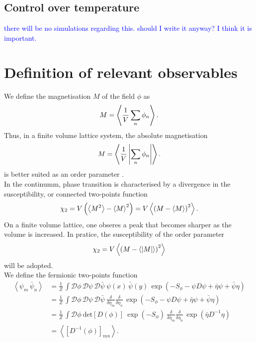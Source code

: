 \subsection{Control over temperature}
\textcolor{blue}{there will be no simulations regarding this. should I write it anyway? I think it is important.}

\section{Definition of relevant observables}
\label{sec:observables}
We define the magnetisation $M$ of the field $\phi$ as
\begin{equation*}
    M = \left\langle \frac{1}{V}\sum_n \phi_n \right\rangle.
\end{equation*}
Thus, in a finite volume lattice system, the absolute magnetisation
\begin{equation*}
    M = \left\langle \frac{1}{V}\left|\sum_n \phi_n\right| \right\rangle.
\end{equation*}
is better suited as an order parameter \cite{friedli_velenik_2017,gattringer_LQCD}. \\
In the continumm, phase transition is characterised by a divergence in the susceptibility, or connected two-points function
\begin{equation*}
    \chi_2 = V \left(\left\langle M^2 \right\rangle - \left\langle M \right\rangle^2\right) = V \left\langle \left(M-\left\langle M \right\rangle\right)^2 \right\rangle.
\end{equation*}
On a finite volume lattice, one obseres a peak that becomes sharper as the volume is increased. In pratice, the susceptibility of the order parameter 
\begin{equation*}
    \chi_2 = V \left\langle \left(M-\left\langle |M| \right\rangle\right)^2 \right\rangle
\end{equation*}
will be adopted. \\
We define the fermionic two-points function
\begin{equation} 
\begin{aligned}
    \left\langle \psi_m \, \bar\psi_n \right\rangle 
    &= \frac{1}{Z} \, \int \mathcal{D}\phi \, \mathcal{D}\psi \, \mathcal{D}\bar\psi \ \psi(x) \, \bar\psi(y) \, \exp \left( - S_\phi - \psi D \psi + \bar\eta \psi + \bar \psi \eta \right) \\
    &= \frac{1}{Z} \, \int \mathcal{D}\phi \, \mathcal{D}\psi \, \mathcal{D}\bar\psi \ \frac{\delta}{\delta \bar \eta_m} \frac{\delta}{\delta \eta_n} \, \exp \left( - S_\phi - \psi D \psi + \bar\eta \psi + \bar \psi \eta \right) \\
    &= \frac{1}{Z} \, \int \mathcal{D}\phi \ \text{det}\left[D(\phi)\right] \ \exp \left( - S_\phi \right) \ \frac{\delta}{\delta \bar \eta_m} \frac{\delta}{\delta \eta_n} \, \exp\left( \bar\eta D^{-1} \eta \right) \\
    &= \left\langle \left[D^{-1}(\phi)\right]_{mn}\right\rangle.
\end{aligned}
\label{eq:D_inv_condensate}
\end{equation}
